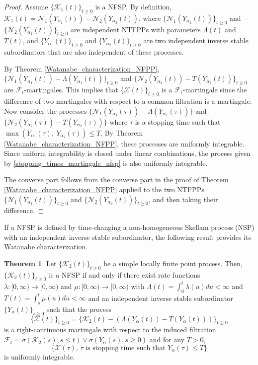 \documentclass[11pt,oneside,reqno]{amsart}
\theoremstyle{definition}
\newtheorem{theorem}{\bf Theorem}[section]
\theoremstyle{remarkstyle}
\begin{document}
\begin{proof}
Assume $\{\mathcal{K}_1(t)\}_{t\ge 0}$ is a NFSP. By definition,  $\mathcal{K}_1(t)=\mathcal{N}_1(Y_{\alpha_1}(t))-\mathcal{N}_2(Y_{\alpha_2}(t))$, where $\{\mathcal{N}_1(Y_{\alpha_1}(t))\}_{t\ge0}$ and $\{\mathcal{N}_2(Y_{\alpha_2}(t))\}_{t\ge0}$ are independent NTFPPs with parameters $\Lambda(t)$ and $T(t)$, and $\{Y_{\alpha_1}(t)\}_{t\ge 0}$ and $\{Y_{\alpha_2}(t)\}_{t\ge 0}$ are two independent inverse stable subordinators that are also independent of these processes. 

By Theorem \ref{Watanabe_characterization_NFPP}, $\{\mathcal{N}_1(Y_{\alpha_1}(t))-\Lambda(Y_{\alpha_1}(t))\}_{t\ge 0}$ and $\{\mathcal{N}_2(Y_{\alpha_2}(t))-T(Y_{\alpha_2}(t))\}_{t\ge 0}$
 are $\mathcal{F}_t$-martingales. This implies that $\{\mathcal{X}(t)\}_{t\ge 0}$ is a $\mathcal{F}_t$-martingale since the difference of two martingales with respect to a common filtration is a martingale. Now consider the processes $\{\mathcal{N}_1(Y_{\alpha_1}(\tau))-\Lambda(Y_{\alpha_1}(\tau))\}$ and $\{\mathcal{N}_2(Y_{\alpha_2}(\tau))-T(Y_{\alpha_2}(\tau))\}$ where $\tau$ is a stopping time such that $\max\left(Y_{\alpha_1}(\tau),~Y_{\alpha_2}(\tau)\right)\le T$. By Theorem \ref{Watanabe_characterization_NFPP}, these processes are uniformly integrable. Since uniform integrability is closed under linear combinations, the process given by \eqref{stopping_times_martingale_nfsp} is also uniformly integrable.

 The converse part follows from the converse part in the proof of Theorem \ref{Watanabe_characterization_NFPP} applied to the two NTFPPs $\{\mathcal{N}_1(Y_{\alpha_1}(t))\}_{t\ge 0}$ and $\{\mathcal{N}_2(Y_{\alpha_2}(t))\}_{t\ge 0}$, and then taking their difference.
\end{proof}
If a NFSP is defined by time-changing a non-homogeneous Skellam process (NSP) with an independent inverse stable subordinator, the following result provides its Watanabe characterization.
\begin{theorem}\label{Watanabe_characterization_NFSP-II}
    Let $\{\mathcal{K}_2(t)\}_{t\ge 0}$ be a simple locally finite point process. Then, $\{\mathcal{K}_2(t)\}_{t\ge 0}$ is a NFSP if and only if there exist rate functions $\lambda:[0,\infty)\to[0,\infty)$ and $\mu:[0,\infty)\to[0,\infty)$ with $\Lambda(t)=\int_{0}^{t}\lambda(u)du<\infty$ and $T(t)=\int_{o}^{t}\mu(u)du<\infty$ and an independent inverse stable subordinator $\{Y_{\alpha}(t)\}_{t\ge 0}$ such that the process 
    \begin{equation}\label{martingale_form_nfsp-II}
    \{\mathcal{X}(t)\}_{t\ge 0}=\{\mathcal{K}_2(t)-\left(\Lambda(Y_{\alpha}(t))-T(Y_{\alpha}(t))\right)\}_{t\ge 0}    
    \end{equation} 
    is a right-continuous martingale with respect to the induced filtration $\mathcal{F}_t=\sigma\left(\mathcal{K}_2(s),s\le t\right)\vee\sigma\left(Y_{\alpha}(s), s\ge 0\right)$ and for any $T>0$,
    \begin{equation}\label{stopping_times_martingale_nfsp-II}
        \{\mathcal{X}(\tau),\,\tau\,\, \text{is stopping time such that}\,\,Y_{\alpha}(\tau)\le T\}
    \end{equation}
    is uniformly integrable.
\end{theorem}
\end{document}
